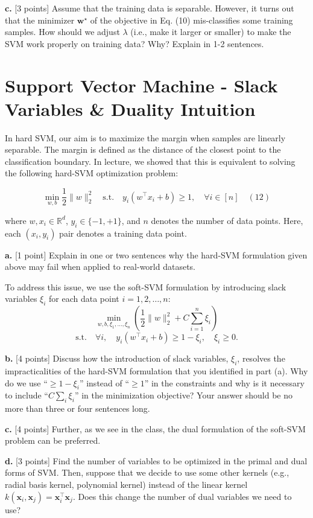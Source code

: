 \documentclass[a3paper,12pt]{extarticle} %
\begin{document}
\noindent \textbf{c.} [3 points] Assume that the training data is separable. However, it turns out that the minimizer \( \mathbf{w}^\star \) of the objective in Eq. (10) mis-classifies some training samples. How should we adjust \( \lambda \) (i.e., make it larger or smaller) to make the SVM work properly on training data? Why? Explain in 1-2 sentences.


\newpage
\section{Support Vector Machine - Slack Variables \& Duality Intuition}

In hard SVM, our aim is to maximize the margin when samples are linearly separable. The margin is defined as the distance of the closest point to the classification boundary. In lecture, we showed that this is equivalent to solving the following hard-SVM optimization problem:

\[
\min_{w, b} \frac{1}{2} \|w\|_2^2 \quad \text{s.t.} \quad y_i(w^\top x_i + b) \geq 1, \quad \forall i \in [n] \quad (12)
\]

where \( w, x_i \in \mathbb{R}^d \), \( y_i \in \{-1, +1\} \), and \( n \) denotes the number of data points. Here, each \( (x_i, y_i) \) pair denotes a training data point.

\noindent \textbf{a.} [1 point] Explain in one or two sentences why the hard-SVM formulation given above may fail when applied to real-world datasets.

To address this issue, we use the soft-SVM formulation by introducing slack variables $\xi_i$ for each data point $i = 1, 2, \ldots, n$:
\[
\min_{w, b, \xi_1, \ldots, \xi_n} \left( \frac{1}{2} \|w\|_2^2 + C \sum_{i=1}^n \xi_i \right)
\]
\[
\text{s.t.} \quad \forall i, \quad y_i(w^\top x_i + b) \geq 1 - \xi_i, \quad \xi_i \geq 0.
\]

\noindent \textbf{b.} [4 points] Discuss how the introduction of slack variables, $\xi_i$, resolves the impracticalities of the hard-SVM formulation that you identified in part (a). Why do we use “$\geq 1 - \xi_i$” instead of “$\geq 1$” in the constraints and why is it necessary to include “$C \sum_i \xi_i$” in the minimization objective? Your answer should be no more than three or four sentences long.

\noindent \textbf{c.} [4 points] Further, as we see in the class, the dual formulation of the soft-SVM problem can be preferred.

\noindent \textbf{d.} [3 points] Find the number of variables to be optimized in the primal and dual forms of SVM. Then, suppose that we decide to use some other kernels (e.g., radial basis kernel, polynomial kernel) instead of the linear kernel \( k(\mathbf{x}_i, \mathbf{x}_j) = \mathbf{x}_i^\top \mathbf{x}_j \). Does this change the number of dual variables we need to use?
\end{document}
